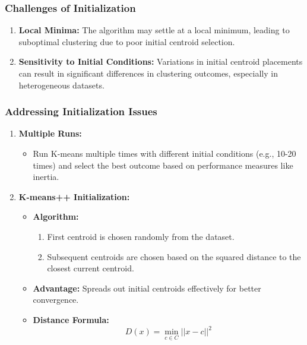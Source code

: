 \documentclass[aspectratio=169]{beamer}
\begin{document}
\begin{frame}[fragile]
    \frametitle{Challenges of Initialization}
    \begin{enumerate}
        \item \textbf{Local Minima:} The algorithm may settle at a local minimum, leading to suboptimal clustering due to poor initial centroid selection.
        
        \item \textbf{Sensitivity to Initial Conditions:} Variations in initial centroid placements can result in significant differences in clustering outcomes, especially in heterogeneous datasets.
    \end{enumerate}
\end{frame}

\begin{frame}[fragile]
    \frametitle{Addressing Initialization Issues}
    \begin{enumerate}
        \item \textbf{Multiple Runs:}
            \begin{itemize}
                \item Run K-means multiple times with different initial conditions (e.g., 10-20 times) and select the best outcome based on performance measures like inertia.
            \end{itemize}
        
        \item \textbf{K-means++ Initialization:}
            \begin{itemize}
                \item \textbf{Algorithm:}
                    \begin{enumerate}
                        \item First centroid is chosen randomly from the dataset.
                        \item Subsequent centroids are chosen based on the squared distance to the closest current centroid.
                    \end{enumerate}
                \item \textbf{Advantage:} Spreads out initial centroids effectively for better convergence.
                \item \textbf{Distance Formula:}
                    \[
                    D(x) = \min_{c \in C} ||x - c||^2
                    \]
            \end{itemize}
    \end{enumerate}
\end{frame}
\end{document}
